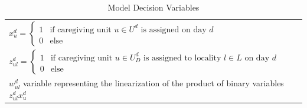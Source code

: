 \documentclass[11pt,twoside]{article}
\numberwithin{Theorem}{section}
\numberwithin{Definition}{section}
\numberwithin{Lemma}{section}
\numberwithin{Algorithm}{section}
\numberwithin{equation}{section}
\begin{document}
\begin{table}[H]
	\caption{Model Decision Variables}
	\label{tab:varstab}
	\begin{tabular}{l}
		$x_u^d = \begin{cases}
			1 & \text{if caregiving unit } u \in U^d \text{ is assigned on day } d\\
			0 & \text{else}
		\end{cases}$ \\

		$z_{ul}^d = \begin{cases}
			1 & \text{if caregiving unit } u \in U_D^d \text{ is assigned to locality } l \in L \text{ on day } d\\
			0 & \text{else}
		\end{cases}$\\

		$w_{ul}^d$ \quad variable representing the linearization of the product of binary variables $z_{ul}^d x_u^d$
	\end{tabular}
\end{table}
\end{document}
